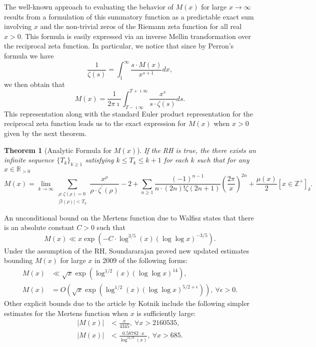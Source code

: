 \documentclass[11pt,reqno,a4letter]{article}
\numberwithin{figure}{section}
\numberwithin{table}{section}
\newcommand{\Iverson}[1]{\ensuremath{\left[#1\right]_{\delta}}}
\theoremstyle{plain}
\newtheorem{theorem}{Theorem}
\numberwithin{theorem}{section}
\theoremstyle{definition}
\begin{document}
The well-known approach to evaluating the behavior of $M(x)$ for large 
$x \rightarrow \infty$ results from a formulation of this summatory 
function as a predictable exact sum involving $x$ and the non-trivial 
zeros of the Riemann zeta function for all real $x > 0$. 
This formula is easily expressed via an inverse Mellin transformation 
over the reciprocal zeta function. In particular, 
we notice that since by Perron's formula we have 
\[
\frac{1}{\zeta(s)} = \int_1^{\infty} \frac{s \cdot M(x)}{x^{s+1}} dx, 
\]
we then obtain that 
\[
M(x) = \frac{1}{2\pi\imath} \int_{T-\imath\infty}^{T+\imath\infty} 
     \frac{x^s}{s \cdot \zeta(s)} ds. 
\] 
This representation along with the standard Euler product 
representation for the reciprocal zeta function leads us to the 
exact expression for $M(x)$ when $x > 0$ given by the next theorem. 

\begin{theorem}[Analytic Formula for $M(x)$] 
\label{theorem_MxMellinTransformInvFormula} 
If the RH is true, the there exists an infinite sequence 
$\{T_k\}_{k \geq 1}$ satisfying $k \leq T_k \leq k+1$ for each $k$ 
such that for any $x \in \mathbb{R}_{>0}$ 
\[
M(x) = \lim_{k \rightarrow \infty} 
     \sum_{\substack{\rho: \zeta(\rho) = 0 \\ |\Im(\rho)| < T_k}} 
     \frac{x^{\rho}}{\rho \cdot \zeta^{\prime}(\rho)} - 2 + 
     \sum_{n \geq 1} \frac{(-1)^{n-1}}{n \cdot (2n)! \zeta(2n+1)} 
     \left(\frac{2\pi}{x}\right)^{2n} + 
     \frac{\mu(x)}{2} \Iverson{x \in \mathbb{Z}^{+}}. 
\] 
\end{theorem} 

An unconditional bound on the Mertens function due to Walfisz 
\cite{see Ivic} states that there is an absolute constant $C > 0$ such that 
$$M(x) \ll x \exp\left(-C \cdot \log^{3/5}(x) 
  (\log\log x)^{-3/5}\right).$$ 
Under the assumption of the RH, Soundararajan proved new updated estimates 
bounding $M(x)$ for large $x$ in 2009 of the following forms: 
\begin{align*} 
M(x) & \ll \sqrt{x} \exp\left(\log^{1/2}(x) (\log\log x)^{14}\right), \\ 
M(x) & = O\left(\sqrt{x} \exp\left( 
     \log^{1/2}(x) (\log\log x)^{5/2+\epsilon}\right)\right),\ 
     \forall \epsilon > 0. 
\end{align*} 
Other explicit bounds due to the article by Kotnik include the following 
simpler estimates for the Mertens function when $x$ is sufficiently 
large: 
\begin{align*} 
|M(x)| & < \frac{x}{4345},\ \forall x > 2160535, \\ 
|M(x)| & < \frac{0.58782 \cdot x}{\log^{11/9}(x)},\ \forall x > 685. 
\end{align*} 
\end{document}
